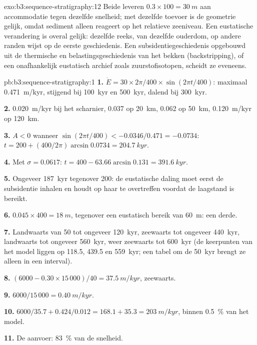 \begin{solution}{exo:b3:sequence-stratigraphy:12}
Beide leveren $0.3\times100 = \qty{30}{m}$ aan accommodatie tegen dezelfde snelheid; met
dezelfde toevoer is de geometrie gelijk, omdat sediment alleen reageert op het
relatieve zeeniveau. Een eustatische verandering is overal gelijk: dezelfde
reeks, van dezelfde ouderdom, op andere randen wijst op de eerste geschiedenis. Een
subsidentiegeschiedenis opgebouwd uit de thermische en belastingsgeschiedenis van het bekken
(backstripping), of een onafhankelijk eustatisch archief zoals zuurstofisotopen,
scheidt ze eveneens.
\end{solution}

\begin{solution}{pb:b3:sequence-stratigraphy:1}
\textbf{1.} $\dot E = 30\times2\pi/400\times\sin(2\pi t/400)$: maximaal
\qty{0.471}{m/kyr}, stijgend bij \qty{100}{kyr} en \qty{500}{kyr}, dalend bij
\qty{300}{kyr}.

\textbf{2.} \qty{0.020}{m/kyr} bij het scharnier, 0.037 op \qty{20}{km}, 0.062 op
\qty{50}{km}, \qty{0.120}{m/kyr} op \qty{120}{km}.

\textbf{3.} $A < 0$ wanneer $\sin(2\pi t/400) < -0.0346/0.471 = -0.0734$: $t =
200 + (400/2\pi)\arcsin0.0734 = \qty{204.7}{kyr}$.

\textbf{4.} Met $\sigma = 0.0617$: $t = 400 - 63.66\arcsin0.131 =
\qty{391.6}{kyr}$.

\textbf{5.} Ongeveer \qty{187}{kyr} tegenover 200: de eustatische daling moet eerst
de subsidentie inhalen en houdt op haar te overtreffen voordat de laagstand is bereikt.

\textbf{6.} $0.045\times400 = \qty{18}{m}$, tegenover een eustatisch bereik van
\qty{60}{m}: een derde.

\textbf{7.} Landwaarts van 50 tot ongeveer \qty{120}{kyr}, zeewaarts tot ongeveer
\qty{440}{kyr}, landwaarts tot ongeveer \qty{560}{kyr}, weer zeewaarts tot
\qty{600}{kyr} (de keerpunten van het model liggen op 118.5, 439.5 en
\qty{559}{kyr}; een tabel om de \qty{50}{kyr} brengt ze alleen in een interval).

\textbf{8.} $(6000 - 0.30\times15\,000)/40 = \qty{37.5}{m/kyr}$, zeewaarts.

\textbf{9.} $6000/15\,000 = \qty{0.40}{m/kyr}$.

\textbf{10.} $6000/35.7 + 0.424/0.012 = 168.1 + 35.3 = \qty{203}{m/kyr}$,
binnen \qty{0.5}{\percent} van het model.

\textbf{11.} De aanvoer: \qty{83}{\percent} van de snelheid.


\end{solution}
